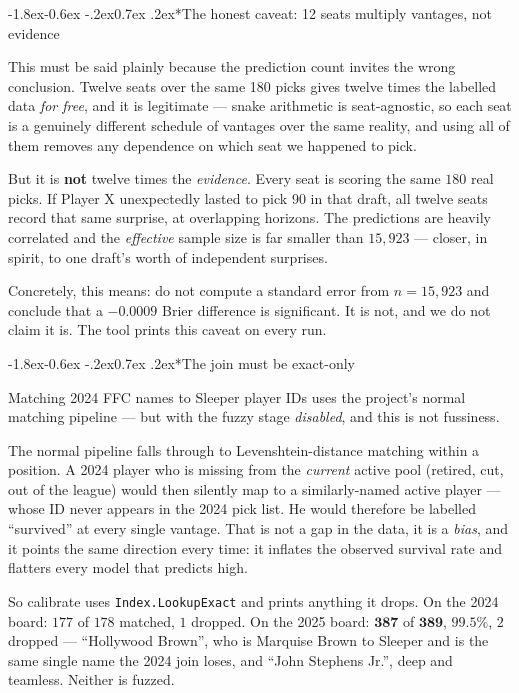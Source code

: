 \documentclass[10pt,a4paper]{article}
\makeatletter
\theoremstyle{plain}
\theoremstyle{definition}
\theoremstyle{remark}
\newcommand{\code}[1]{\texttt{\small #1}}
\renewcommand\subsubsection{\@startsection{subsubsection}{3}{\z@}%
  {-1.8ex\@plus -0.6ex \@minus -.2ex}{0.7ex \@plus .2ex}{\normalfont\normalsize\bfseries}}
\makeatother
\begin{document}
\subsubsection*{The honest caveat: 12 seats multiply vantages, not evidence}

This must be said plainly because the prediction count invites the wrong conclusion.
Twelve seats over the same 180 picks gives twelve times the labelled data \emph{for
free}, and it is legitimate --- snake arithmetic is seat-agnostic, so each seat is a
genuinely different schedule of vantages over the same reality, and using all of them
removes any dependence on which seat we happened to pick.

But it is \textbf{not} twelve times the \emph{evidence}. Every seat is scoring the same
$180$ real picks. If Player X unexpectedly lasted to pick 90 in that draft, all twelve
seats record that same surprise, at overlapping horizons. The predictions are heavily
correlated and the \emph{effective} sample size is far smaller than $15{,}923$ ---
closer, in spirit, to one draft's worth of independent surprises.

Concretely, this means: do not compute a standard error from $n = 15{,}923$ and conclude
that a $-0.0009$ Brier difference is significant. It is not, and we do not claim it is.
The tool prints this caveat on every run.

\subsubsection*{The join must be exact-only}

Matching 2024 FFC names to Sleeper player IDs uses the project's normal matching
pipeline --- but with the fuzzy stage \emph{disabled}, and this is not fussiness.

The normal pipeline falls through to Levenshtein-distance matching within a position. A
2024 player who is missing from the \emph{current} active pool (retired, cut, out of the
league) would then silently map to a similarly-named active player --- whose ID never
appears in the 2024 pick list. He would therefore be labelled ``survived'' at every
single vantage. That is not a gap in the data, it is a \emph{bias}, and it points the
same direction every time: it inflates the observed survival rate and flatters every
model that predicts high.

So calibrate uses \code{Index.LookupExact} and prints anything it drops. On the 2024
board: $177$ of $178$ matched, $1$ dropped. On the 2025 board: $\mathbf{387}$ of
$\mathbf{389}$, $\mathbf{99.5\%}$, $2$ dropped --- ``Hollywood Brown'', who is Marquise
Brown to Sleeper and is the same single name the 2024 join loses, and ``John Stephens
Jr.'', deep and teamless. Neither is fuzzed.
\end{document}
